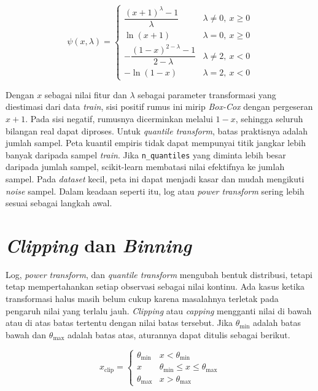 \[
\psi(x, \lambda) = \begin{cases} \dfrac{(x + 1)^{\lambda} - 1}{\lambda} & \lambda \neq 0,\ x \geq 0 \\[4pt] \ln(x + 1) & \lambda = 0,\ x \geq 0 \\[4pt] -\dfrac{(1 - x)^{2 - \lambda} - 1}{2 - \lambda} & \lambda \neq 2,\ x < 0 \\[4pt] -\ln(1 - x) & \lambda = 2,\ x < 0 \end{cases}
\]

Dengan \(x\) sebagai nilai fitur dan \(\lambda\) sebagai parameter transformasi yang diestimasi dari data \emph{train}, sisi positif rumus ini mirip \emph{Box-Cox} dengan pergeseran \(x + 1\). Pada sisi negatif, rumusnya dicerminkan melalui \(1 - x\), sehingga seluruh bilangan real dapat diproses. Untuk \emph{quantile transform}, batas praktisnya adalah jumlah sampel. Peta kuantil empiris tidak dapat mempunyai titik jangkar lebih banyak daripada sampel \emph{train}. Jika \passthrough{\lstinline!n_quantiles!} yang diminta lebih besar daripada jumlah sampel, scikit-learn membatasi nilai efektifnya ke jumlah sampel. Pada \emph{dataset} kecil, peta ini dapat menjadi kasar dan mudah mengikuti \emph{noise} sampel. Dalam keadaan seperti itu, log atau \emph{power transform} sering lebih sesuai sebagai langkah awal.

\section{\texorpdfstring{\emph{Clipping} dan \emph{Binning}}{Clipping dan Binning}}\label{clipping-dan-binning}

Log, \emph{power transform}, dan \emph{quantile transform} mengubah bentuk distribusi, tetapi tetap mempertahankan setiap observasi sebagai nilai kontinu. Ada kasus ketika transformasi halus masih belum cukup karena masalahnya terletak pada pengaruh nilai yang terlalu jauh. \emph{Clipping} atau \emph{capping} mengganti nilai di bawah atau di atas batas tertentu dengan nilai batas tersebut. Jika \(\theta_{\min}\) adalah batas bawah dan \(\theta_{\max}\) adalah batas atas, aturannya dapat ditulis sebagai berikut.

\[
x_{\text{clip}} = \begin{cases} \theta_{\min} & x < \theta_{\min} \\ x & \theta_{\min} \leq x \leq \theta_{\max} \\ \theta_{\max} & x > \theta_{\max} \end{cases}
\]

